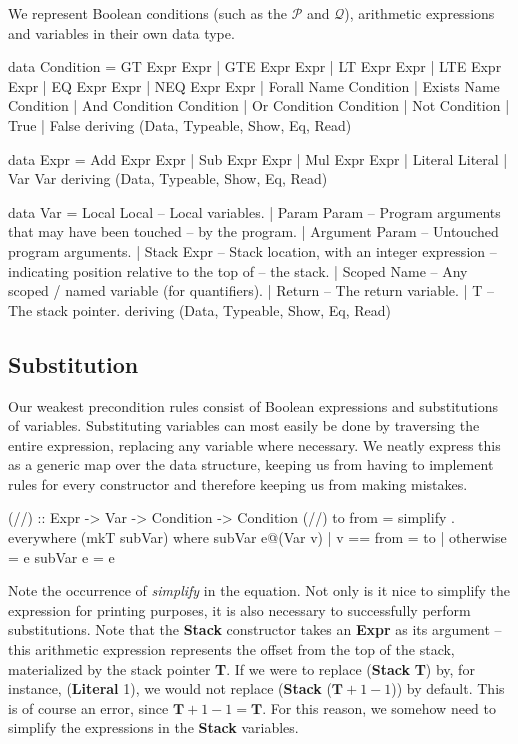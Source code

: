 \documentclass[a4paper]{article}
\newcommand{\Q}{\mathcal{Q}}
\renewcommand{\P}{\mathcal{P}}
\begin{document}
We represent Boolean conditions (such as the $\P$ and $\Q$), arithmetic expressions and variables in their own data type.
\begin{haskell}
data Condition = GT Expr Expr  | GTE Expr Expr | LT Expr Expr
               | LTE Expr Expr | EQ Expr Expr  | NEQ Expr Expr
               | Forall Name Condition   | Exists Name Condition
               | And Condition Condition | Or Condition Condition
               | Not Condition
               | True | False
  deriving (Data, Typeable, Show, Eq, Read)

data Expr = Add Expr Expr | Sub Expr Expr | Mul Expr Expr
          | Literal Literal
          | Var Var
  deriving (Data, Typeable, Show, Eq, Read)

data Var = Local Local    -- Local variables.
         | Param Param    -- Program arguments that may have been touched
                          -- by the program.
         | Argument Param -- Untouched program arguments.
         | Stack Expr     -- Stack location, with an integer expression
                          -- indicating position relative to the top of
                          -- the stack.
         | Scoped Name    -- Any scoped / named variable (for quantifiers).
         | Return         -- The return variable.
         | T              -- The stack pointer.
  deriving (Data, Typeable, Show, Eq, Read)
\end{haskell}

\subsection{Substitution}
Our weakest precondition rules consist of Boolean expressions and substitutions of variables. Substituting variables can most easily be done by traversing the entire expression, replacing any variable where necessary. We neatly express this as a generic map over the data structure, keeping us from having to implement rules for every constructor and therefore keeping us from making mistakes.

\begin{haskell}
(//) :: Expr -> Var -> Condition -> Condition
(//) to from = simplify . everywhere (mkT subVar)
  where
    subVar e@(Var v) | v == from = to
                     | otherwise = e
    subVar e = e
\end{haskell}

Note the occurrence of \textit{simplify} in the equation. Not only is it nice to simplify the expression for printing purposes, it is also necessary to successfully perform substitutions. Note that the \textbf{Stack} constructor takes an \textbf{Expr} as its argument -- this arithmetic expression represents the offset from the top of the stack, materialized by the stack pointer \textbf{T}. If we were to replace (\textbf{Stack} \textbf{T}) by, for instance, (\textbf{Literal} 1), we would not replace (\textbf{Stack} ($\mathbf{T} + 1 - 1$)) by default. This is of course an error, since $\mathbf{T} + 1 - 1 = \mathbf{T}$. For this reason, we somehow need to simplify the expressions in the \textbf{Stack} variables.
\end{document}
